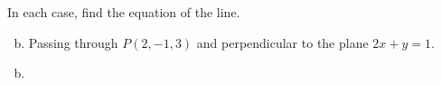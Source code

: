 \documentclass[../main.tex]{subfiles}
\begin{document}
In each case, find the equation of the line.
\begin{enumerate}[a)]
	\setcounter{enumi}{1}
	\item Passing through $P(2, -1, 3)$ and perpendicular to the plane $2x + y = 1$.
\end{enumerate}

\solution
\begin{enumerate}[a)]
	\setcounter{enumi}{1}
	\item 
\end{enumerate}
\end{document}
